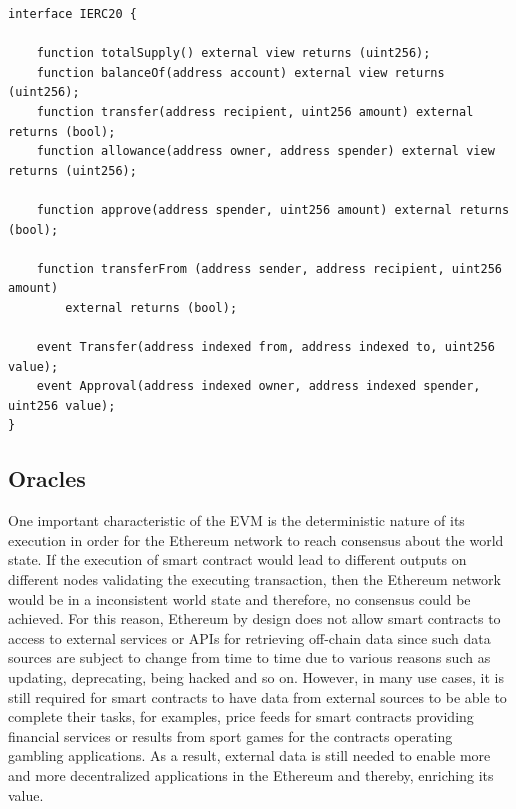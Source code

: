 \begin{lstlisting}[language=Solidity, label={lst:erc20}, captionpos=b, caption={The ERC20 interface that fungible tokens should implement}]
interface IERC20 {

    function totalSupply() external view returns (uint256);
    function balanceOf(address account) external view returns (uint256);
    function transfer(address recipient, uint256 amount) external returns (bool);
    function allowance(address owner, address spender) external view returns (uint256);

    function approve(address spender, uint256 amount) external returns (bool);

    function transferFrom (address sender, address recipient, uint256 amount) 
        external returns (bool);

    event Transfer(address indexed from, address indexed to, uint256 value);
    event Approval(address indexed owner, address indexed spender, uint256 value);
}
\end{lstlisting}





\subsection{Oracles} \label{subsec:oracle}

One important characteristic of the EVM is the deterministic nature of its execution in order for the Ethereum network to reach consensus about the world state. If the execution of smart contract would lead to different outputs on different nodes validating the executing transaction, then the Ethereum network would be in a inconsistent world state and therefore, no consensus could be achieved. For this reason, Ethereum by design does not allow smart contracts to access to external services or APIs for retrieving off-chain data since such data sources are subject to change from time to time due to various reasons such as updating, deprecating, being hacked and so on. However, in many use cases, it is still required for smart contracts to have data from external sources to be able to complete their tasks, for examples, price feeds for smart contracts providing financial services or results from sport games for the contracts operating gambling applications. As a result, external data is still needed to enable more and more decentralized applications in the Ethereum and thereby, enriching its value. 

